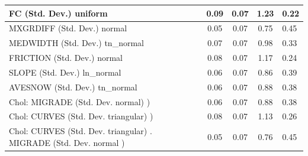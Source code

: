 \begin{table}
\begin{center}
\begin{tabular}{|l|l|c|c|c|l|}
			FC (Std. Dev.) uniform &  & 0.09 & 0.07 & 1.23 & 0.22 \\
			\hline
			MXGRDIFF (Std. Dev.) normal &  & 0.05 & 0.07 & 0.75 & 0.45 \\
			\hline
			MEDWIDTH (Std. Dev.) tn_normal &  & 0.07 & 0.07 & 0.98 & 0.33 \\
			\hline
			FRICTION (Std. Dev.) normal &  & 0.08 & 0.07 & 1.17 & 0.24 \\
			\hline
			SLOPE (Std. Dev.) ln_normal &  & 0.06 & 0.07 & 0.86 & 0.39 \\
			\hline
			AVESNOW (Std. Dev.) tn_normal &  & 0.06 & 0.07 & 0.88 & 0.38 \\
			\hline
			 Chol: MIGRADE (Std. Dev. normal) ) &  & 0.06 & 0.07 & 0.88 & 0.38 \\
			\hline
			 Chol: CURVES (Std. Dev. triangular) ) &  & 0.08 & 0.07 & 1.13 & 0.26 \\
			\hline
			 Chol: CURVES (Std. Dev. triangular) . MIGRADE (Std. Dev.   normal ) &  & 0.05 & 0.07 & 0.76 & 0.45 \\
			\hline
		\end{tabular}
	\end{center}
\end{table}